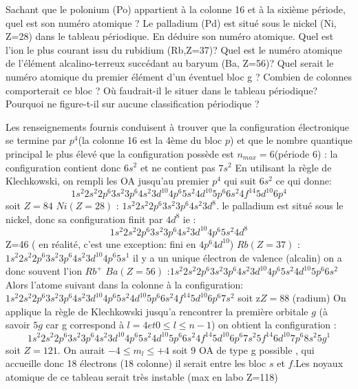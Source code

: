\begin{Exercise}[title=Quelques questions autour du tableau périodique]
	\Question Sachant que le polonium (Po) appartient à la colonne 16 et à la sixième période, quel est son
	numéro atomique	?
	\Question Le palladium (Pd) est situé sous le nickel (Ni, Z=28) dans le tableau périodique. En déduire son
	numéro atomique.
	\Question 	Quel est l’ion le plus courant issu du rubidium
	(Rb,Z=37)?
	\Question Quel est le numéro atomique de l’élément alcalino-terreux succédant au baryum (Ba, Z=56)?
	\Question Quel serait le numéro atomique du premier élément d’un éventuel bloc g ? Combien de colonnes
	comporterait ce bloc ? Où faudrait-il le situer dans le tableau périodique? Pourquoi ne figure-t-il sur aucune classification périodique ?
\end{Exercise}
\begin{Answer}
	\Question Les renseignements fournis conduisent à trouver que la configuration électronique se termine
	par $p^4$(la colonne 16 est la 4ème du bloc $p$) et que le nombre quantique principal le plus élevé que la
	configuration possède est $n_{max}=6$(période 6)
	: la configuration contient donc $6s^2$ et ne contient pas $7s^2$ En utilisant la règle de Klechkowski, on rempli les OA jusqu'au premier $p^4$ qui suit $6s^2$ ce qui donne:
	\[1s^2 2s^2 2p^6 3s^2 3p^6 4s^2 3d^{10} 4p^6 5s^2 4d^{10} 5p^6 6s^2 4f^{14} 5d^{10}6p^4\]soit $Z=84$
	\Question $Ni(Z=28)$ : $1s^2 2s^2 2p^6 3s^2 3p^6 4s^2 3d^8$. le palladium est situé sous le nickel, donc sa configuration finit par $4d^8$ ie :
	 \[1s^2 2s^2 2p^6 3s^2 3p^6 4s^2 3d^{10} 4p^6 5s^2 4d^8\] Z=46 ( en réalité, c'est une exception: fini en $4p^6 4d^{10}$)
	\Question $Rb(Z=37)$ : $1s^2 2s^2 2p^6 3s^2 3p^6 4s^2 3d^{10} 4p^6 5s^1$ il y a un unique électron de valence (alcalin) on a donc souvent l'ion $Rb^+$
	\Question $Ba(Z=56)$ :$ 1s^2 2s^2 2p^6 3s^2 3p^6 4s^2 3d^{10} 4p^6 5s^2 4d^{10} 5p^6 6s^2$ Alors l'atome suivant dans la colonne à la configuration:
	$1s^2 2s^2 2p^6 3s^2 3p^6 4s^2 3d^{10} 4p^6 5s^2 4d^{10} 5p^6 6s^2 4f^{14} 5d^{10}6p^6 7s^2$ soit z$Z=88$ (radium)
	\Question On applique la règle de Klechkowski jusqu'a rencontrer la première orbitale $g$ (à savoir $5g$ car g correspond à $l=4 et 0\leq l\leq n-1$) on obtient la configuration :
	\[1s^2 2s^2 2p^6 3s^2 3p^6 4s^2 3d^{10} 4p^6 5s^2 4d^{10} 5p^6 6s^2 4f^{14} 5d^{10}6p^6 7s^2 5f^{14} 6d^{10} 7p^6 8s^2 5g^1\] 
	soit $Z=121$.
	On aurait $-4\leq m_l \leq +4$ soit 9 OA de type g possible , qui accueille donc 18 électrons (18 colonne) il serait entre les bloc $s$ et $f$.Les noyaux atomique de ce tableau serait très instable (max en labo Z=118)

\end{Answer}

